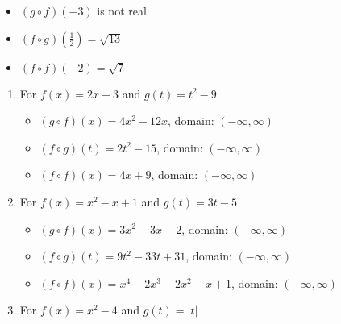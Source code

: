 \documentclass{ximera}
\begin{document}
\begin{enumerate}
\begin{multicols}{3}

\begin{itemize}

\item  $(g\circ f)(-3)$ is not real

\item  $(f\circ g)\left(\frac{1}{2}\right) = \sqrt{13}$

\item  $(f \circ f)(-2) = \sqrt{7}$

\end{itemize}

\end{multicols}
\setcounter{HW}{\value{enumi}}
\end{enumerate}

\begin{enumerate}
\setcounter{enumi}{\value{HW}}

\item For $f(x) = 2x+3$ and $g(t) = t^2-9$

\begin{itemize}

\item  $(g \circ f)(x) = 4x^2+12x$, domain: $(-\infty, \infty)$

\item  $(f \circ g)(t) = 2t^2-15$, domain: $(-\infty, \infty)$

\item  $(f \circ f)(x) = 4x+9$, domain: $(-\infty, \infty)$

\end{itemize}


\item For  $f(x) = x^2 -x+1$ and $g(t) = 3t-5$ 

\begin{itemize}

\item  $(g \circ f)(x) = 3x^2-3x-2$, domain: $(-\infty, \infty)$

\item  $(f \circ g)(t) =9t^2-33t+31$, domain: $(-\infty, \infty)$

\item  $(f \circ f)(x) = x^4-2x^3+2x^2-x+1$, domain: $(-\infty, \infty)$

\end{itemize}

\item For  $f(x) = x^2-4$ and $g(t) = |t|$ 


\end{enumerate}
\end{document}
